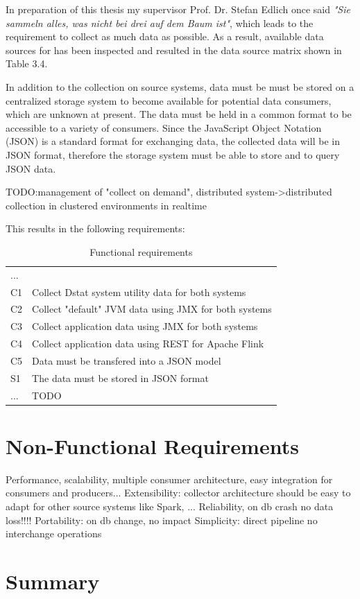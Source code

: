In preparation of this thesis my supervisor Prof. Dr. Stefan Edlich once said \textit{"Sie sammeln
alles, was nicht bei drei auf dem Baum ist"}, which leads to the requirement to collect as much data
as possible. As a result, available data sources for has been inspected and resulted in the data source matrix
shown in Table 3.4.

In addition to the collection on source systems, data must be must be stored on a centralized storage system
to become available for potential data consumers, which are unknown at present. The data must be held in a
common format to be accessible to a variety of consumers. Since the JavaScript Object Notation (JSON)
is a standard format for exchanging data, the collected data will be in JSON format,
therefore the storage system must be able to store and to query JSON data.

TODO:management of "collect on demand", distributed system->distributed collection in clustered environments in realtime

This results in the following requirements:

\begin{table}[H]
\begin{tabular}{ll}
... & \\
C1 & Collect Dstat system utility data for both systems \\
C2 & Collect "default" JVM data using JMX for both systems \\
C3 & Collect application data using JMX for both systems \\
C4 & Collect application data using REST for Apache Flink \\
C5 & Data must be transfered into a JSON model \\
S1 & The data must be stored in JSON format \\
... & TODO \\
\end{tabular}
\caption{Functional requirements}
\label{functional-requirements}
\end{table}

\section{Non-Functional Requirements}
Performance, scalability, multiple consumer architecture, easy integration for consumers and producers...
Extensibility: collector architecture should be easy  to adapt for other source systems like Spark, ...
Reliability, on db crash no data loss!!!!
Portability: on db change, no impact
Simplicity: direct pipeline no interchange operations

\section{Summary}